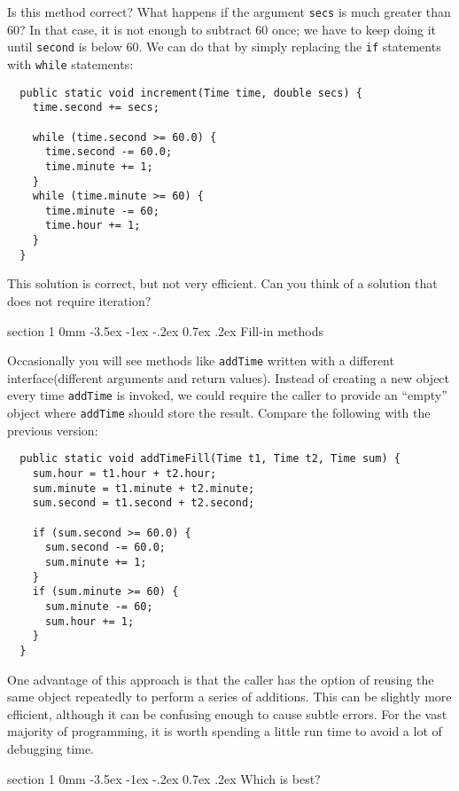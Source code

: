 \documentclass{book}
\makeatletter
\renewcommand{\section}{\@startsection 
    {section} {1} {0mm}%
    {-3.5ex \@plus -1ex \@minus -.2ex}%
    {0.7ex \@plus.2ex}%
    {\normalfont\Large\bfseries}}
\makeatother
\begin{document}
Is this method correct?  What happens if the argument {\tt secs}
is much greater than 60?  In that case, it is not enough to
subtract 60 once; we have to keep doing it until {\tt second}
is below 60.  We can do that by simply replacing the {\tt if}
statements with {\tt while} statements:

\begin{verbatim}
  public static void increment(Time time, double secs) {
    time.second += secs;

    while (time.second >= 60.0) {
      time.second -= 60.0;
      time.minute += 1;
    }
    while (time.minute >= 60) {
      time.minute -= 60;
      time.hour += 1;
    }
  }
\end{verbatim}
%
This solution is correct, but not very efficient.
Can you think of a solution that does not require iteration?

\section{Fill-in methods}

Occasionally you will see methods like {\tt addTime} written
with a different interface(different arguments and return values).
Instead of creating a new object every time {\tt addTime} is
invoked, we could require the caller to provide an ``empty''
object where {\tt addTime} should store the result.  Compare
the following with the previous version:

\begin{verbatim}
  public static void addTimeFill(Time t1, Time t2, Time sum) {
    sum.hour = t1.hour + t2.hour;
    sum.minute = t1.minute + t2.minute;
    sum.second = t1.second + t2.second;

    if (sum.second >= 60.0) {
      sum.second -= 60.0;
      sum.minute += 1;
    }
    if (sum.minute >= 60) {
      sum.minute -= 60;
      sum.hour += 1;
    }
  }
\end{verbatim}
%
One advantage of this approach is that the caller has the option
of reusing the same object repeatedly to perform a series
of additions.  This can be slightly more efficient, although
it can be confusing enough to cause subtle errors.
For the vast majority of programming, it is worth
spending a little run time to avoid a lot of debugging time.

\section{Which is best?}
\end{document}
